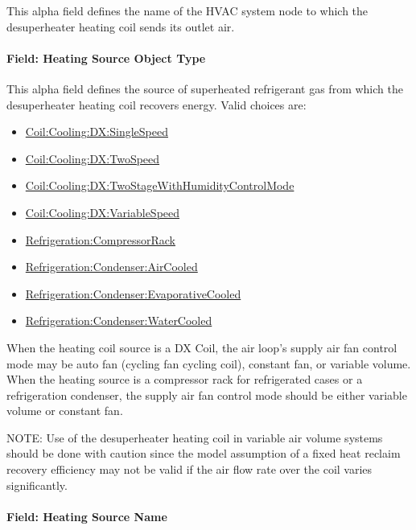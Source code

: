 This alpha field defines the name of the HVAC system node to which the desuperheater heating coil sends its outlet air.

\paragraph{Field: Heating Source Object Type}\label{field-heating-source-object-type}

This alpha field defines the source of superheated refrigerant gas from which the desuperheater heating coil recovers energy. Valid choices are:

\begin{itemize}
\item
  \hyperref[coilcoolingdxsinglespeed]{Coil:Cooling:DX:SingleSpeed}
\item
  \hyperref[coilcoolingdxtwospeed]{Coil:Cooling:DX:TwoSpeed}
\item
  \hyperref[coilcoolingdxtwostagewithhumiditycontrolmode]{Coil:Cooling:DX:TwoStageWithHumidityControlMode}
\item
  \hyperref[coilcoolingdxvariablespeed]{Coil:Cooling:DX:VariableSpeed}
\item
  \hyperref[refrigerationcompressorrack]{Refrigeration:CompressorRack}
\item
  \hyperref[refrigerationcondenseraircooled]{Refrigeration:Condenser:AirCooled}
\item
  \hyperref[refrigerationcondenserevaporativecooled]{Refrigeration:Condenser:EvaporativeCooled}
\item
  \hyperref[refrigerationcondenserwatercooled]{Refrigeration:Condenser:WaterCooled}
\end{itemize}

When the heating coil source is a DX Coil, the air loop's supply air fan control mode may be auto fan (cycling fan cycling coil), constant fan, or variable volume. When the heating source is a compressor rack for refrigerated cases or a refrigeration condenser, the supply air fan control mode should be either variable volume or constant fan.

NOTE: Use of the desuperheater heating coil in variable air volume systems should be done with caution since the model assumption of a fixed heat reclaim recovery efficiency may not be valid if the air flow rate over the coil varies significantly.

\paragraph{Field: Heating Source Name}\label{field-heating-source-name}

